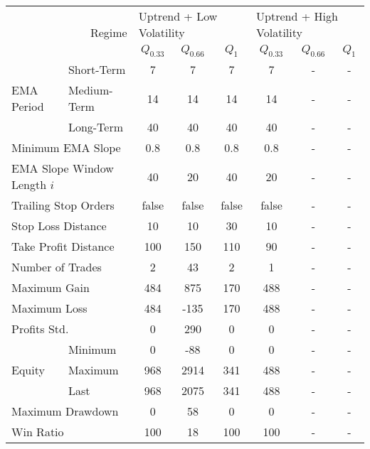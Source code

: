 \centering
\begin{tabular}{ll|cccccc}
    \toprule
    \multicolumn{2}{r|}{\multirow{2}{*}{Regime}} & \multicolumn{3}{l}{Uptrend + Low Volatility}     & \multicolumn{3}{l}{Uptrend + High Volatility}     \\
    \multicolumn{2}{r|}{} & $Q_{0.33}$ & $Q_{0.66}$ & $Q_{1}$ & $Q_{0.33}$ & $Q_{0.66}$ & $Q_{1}$ \\
    \midrule
    \multirow{3}{*}{EMA Period} & Short-Term  & 7   & 7    & 7   & 7   & - & - \\
    & Medium-Term & 14  & 14   & 14  & 14  & - & - \\
    & Long-Term   & 40  & 40   & 40  & 40  & - & - \\
    \multicolumn{2}{l|}{Minimum EMA Slope} & 0.8 & 0.8 & 0.8 & 0.8 & - & - \\
    \multicolumn{2}{l|}{EMA Slope Window Length $i$} & 40 & 20 & 40 & 20 & - & - \\
    \multicolumn{2}{l|}{Trailing Stop Orders} & false & false & false & false & - & - \\
    \multicolumn{2}{l|}{Stop Loss Distance} & 10 & 10 & 30 & 10 & - & - \\
    \multicolumn{2}{l|}{Take Profit Distance} & 100 & 150 & 110 & 90 & - & - \\
    \midrule
    \multicolumn{2}{l|}{Number of Trades} & 2 & 43 & 2 & 1 & - & - \\
    \multicolumn{2}{l|}{Maximum Gain} & 484 & 875 & 170 & 488 & - & - \\
    \multicolumn{2}{l|}{Maximum Loss} & 484 & -135 & 170 & 488 & - & - \\
    \multicolumn{2}{l|}{Profits Std.} & 0 & 290 & 0 & 0 & - & - \\
    \multirow{3}{*}{Equity}     & Minimum     & 0   & -88  & 0   & 0   & - & - \\
    & Maximum     & 968 & 2914 & 341 & 488 & - & - \\
    & Last        & 968 & 2075 & 341 & 488 & - & - \\
    \multicolumn{2}{l|}{Maximum Drawdown} & 0 & 58 & 0 & 0 & - & - \\
    \multicolumn{2}{l|}{Win Ratio} & 100 & 18 & 100 & 100 & - & - \\
    \bottomrule
\end{tabular}